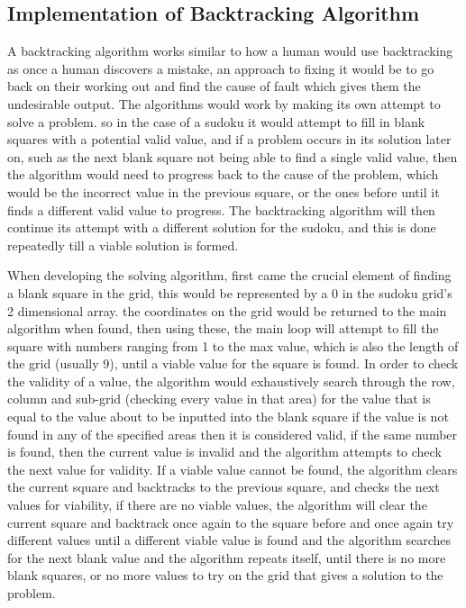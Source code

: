 \documentclass[]{final_report}
\begin{document}
\subsection{Implementation of Backtracking Algorithm}

A backtracking algorithm works similar to how a human would use backtracking as once a human discovers a mistake, an approach to fixing it would be to go back on their working out and find the cause of fault which gives them the undesirable output. The algorithms would work by making its own attempt to solve a problem. so in the case of a sudoku it would attempt to fill in blank squares with a potential valid value, and if a problem occurs in its solution later on, such as the next blank square not being able to find a single valid value, then the algorithm would need to progress back to the cause of the problem, which would be the incorrect value in the previous square, or the ones before until it finds a different valid value to progress. The backtracking algorithm will then continue its attempt with a different solution for the sudoku, and this is done repeatedly till a viable solution is formed.  

When developing the solving algorithm, first came the crucial element of finding a blank square in the grid, this would be represented by a 0 in the sudoku grid’s 2 dimensional array. the coordinates on the grid would be returned to the main algorithm when found, then using these, the main loop will attempt to fill the square with numbers ranging from 1 to the max value, which is also the length of the grid (usually 9), until a viable value for the square is found. In order to check the validity of a value, the algorithm would exhaustively search through the row, column and sub-grid (checking every value in that area) for the value that is equal to the value about to be inputted into the blank square if the value is not found in any of the specified areas then it is considered valid, if the same number is found, then the current value is invalid and the algorithm attempts to check  the next value for validity. If a viable value cannot be found, the algorithm clears the current square and backtracks to the previous square, and checks the next values for viability, if there are no viable values, the algorithm will clear the current square and backtrack once again to the square before and once again try different values until a different viable value is found and the algorithm searches for the next blank value and the algorithm repeats itself, until there is no more blank squares, or no more values to try on the grid that gives a solution to the problem. 
\end{document}
